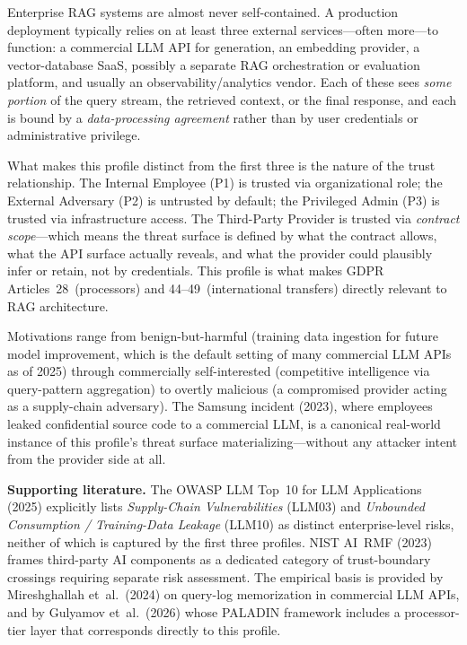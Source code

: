 \documentclass[a4paper,12pt]{report}
\begin{document}
\begin{prosebox}
Enterprise RAG systems are almost never self-contained. A production
deployment typically relies on at least three external services---often
more---to function: a commercial LLM API for generation, an embedding
provider, a vector-database SaaS, possibly a separate RAG orchestration
or evaluation platform, and usually an observability/analytics vendor. Each
of these sees \emph{some portion} of the query stream, the retrieved
context, or the final response, and each is bound by a
\emph{data-processing agreement} rather than by user credentials or
administrative privilege.

What makes this profile distinct from the first three is the nature of
the trust relationship. The Internal Employee (P1) is trusted via
organizational role; the External Adversary (P2) is untrusted by default;
the Privileged Admin (P3) is trusted via infrastructure access. The
Third-Party Provider is trusted via \emph{contract scope}---which means
the threat surface is defined by what the contract allows, what the API
surface actually reveals, and what the provider could plausibly infer or
retain, not by credentials. This profile is what makes GDPR
Articles~28~(processors) and 44--49~(international transfers) directly
relevant to RAG architecture.

Motivations range from benign-but-harmful (training data ingestion for
future model improvement, which is the default setting of many commercial
LLM APIs as of 2025) through commercially self-interested (competitive
intelligence via query-pattern aggregation) to overtly malicious
(a compromised provider acting as a supply-chain adversary). The Samsung
incident (2023), where employees leaked confidential source code to a
commercial LLM, is a canonical real-world instance of this profile's
threat surface materializing---without any attacker intent from the
provider side at all.

\medskip
\textbf{Supporting literature.}
The OWASP LLM Top~10 for LLM Applications (2025) explicitly lists
\emph{Supply-Chain Vulnerabilities} (LLM03) and \emph{Unbounded Consumption /
Training-Data Leakage} (LLM10) as distinct enterprise-level risks,
neither of which is captured by the first three profiles.
NIST AI~RMF (2023) frames third-party AI components as a dedicated
category of trust-boundary crossings requiring separate risk assessment.
The empirical basis is provided by Mireshghallah et~al.\ (2024) on
query-log memorization in commercial LLM APIs, and by
Gulyamov et~al.\ (2026) whose PALADIN framework includes a processor-tier
layer that corresponds directly to this profile.
\end{prosebox}
\end{document}
